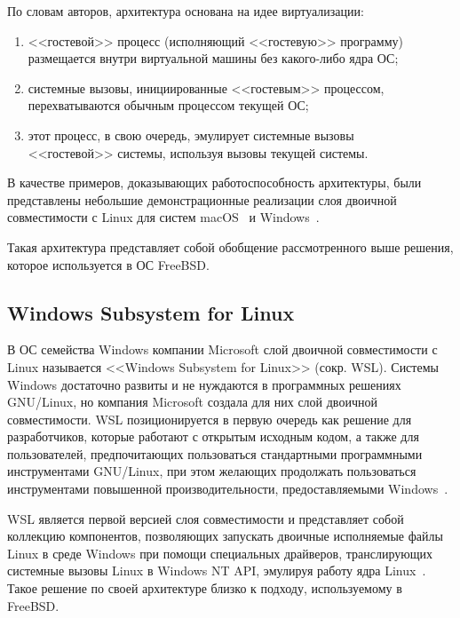 По словам авторов, архитектура основана на идее виртуализации:
\begin{enumerate}
    \item <<гостевой>> процесс (исполняющий <<гостевую>> программу) размещается внутри виртуальной машины без какого-либо ядра ОС;
    \item системные вызовы, инициированные <<гостевым>> процессом, перехватываются обычным процессом текущей ОС;
    \item этот процесс, в свою очередь, эмулирует системные вызовы\\\mbox{<<гостевой>>} системы, используя вызовы текущей системы.~\cite{acm-vee-article}
\end{enumerate}
В качестве примеров, доказывающих работоспособность архитектуры, были представлены небольшие демонстрационные реализации слоя двоичной совместимости с Linux для систем macOS~\cite{noah} и Windows~\cite{noah-windows}.

Такая архитектура представляет собой обобщение рассмотренного выше решения, которое используется в ОС FreeBSD.


\subsection{Windows Subsystem for Linux}

В ОС семейства Windows компании Microsoft слой двоичной совместимости с Linux называется <<Windows Subsystem for Linux>> (сокр. WSL). Системы Windows достаточно развиты и не нуждаются в программных решениях GNU/Linux, но компания Microsoft создала для них слой двоичной совместимости. WSL позиционируется в первую очередь как решение для разработчиков, которые работают с открытым исходным кодом, а также для пользователей, предпочитающих пользоваться стандартными программными инструментами GNU/Linux, при этом желающих продолжать пользоваться инструментами повышенной производительности, предоставляемыми Windows~\cite{wsl-faq}.

WSL является первой версией слоя совместимости и представляет собой коллекцию компонентов, позволяющих запускать двоичные исполняемые файлы Linux в среде Windows при помощи специальных драйверов, транслирующих системные вызовы Linux в Windows NT API, эмулируя работу ядра Linux~\cite{wsl-overview}. Такое решение по своей архитектуре близко к подходу, используемому в FreeBSD.


